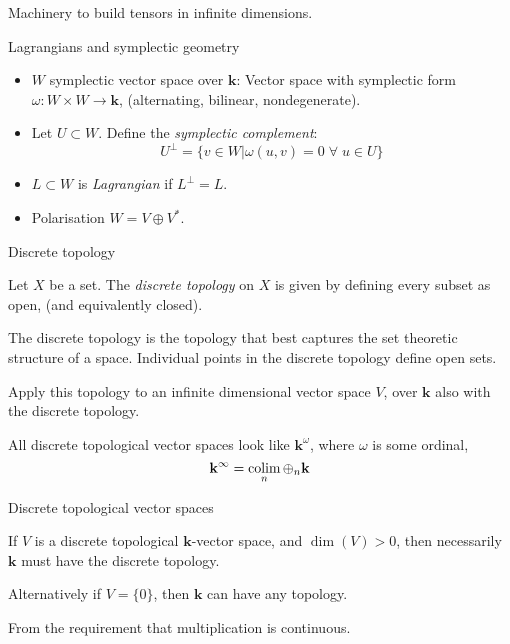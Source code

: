 
   \frame{\sectionpage}
 
    \begin{frame}
     Machinery to build tensors in infinite dimensions.
    \end{frame}
    
    \begin{frame}{Lagrangians and symplectic geometry}
        \begin{itemize}
        \item \(W\) symplectic vector space over \( \mathbf{k}\): Vector space with symplectic form \( \omega : W \times W \rightarrow \mathbf{k}\), (alternating, bilinear, nondegenerate). 
        \item Let \( U \subset W\). Define the \emph{symplectic complement}:
        \[ U^{\perp} = \{ v \in W | \omega(u,v) = 0 \; \forall \; u \in U \} \]
        \item \( L \subset W\) is \emph{Lagrangian} if \( L^{\perp} = L \).
        \item Polarisation \(W = V \oplus V^*\).
        \end{itemize}
    \end{frame}

    
    \begin{frame}{Discrete topology}
    
     \begin{defn}
        Let \(X\) be a set. The \emph{discrete topology} on \(X\) is given by defining every subset as open, (and equivalently closed).
    \end{defn}
    
    The discrete topology is the topology that best captures the set theoretic structure of a space. Individual points in the discrete topology define open sets.

    \end{frame}    


    \begin{frame}
    Apply this topology to an infinite dimensional vector space \(V\), over \( \mathbf{k}\) also with the discrete topology.
    
    All discrete topological vector spaces look like \( \mathbf{k}^{\omega}\), where \( \omega\) is some ordinal, 
    \[ \mathbf{k}^{\infty} = \operatorname*{colim}_n \oplus_n \mathbf{k}\]
    \end{frame}
    
    \begin{frame}{Discrete topological vector spaces}
    
     \begin{lem}
        If \(V\) is a discrete topological \(\mathbf{k}\)-vector space, and \(\dim(V)>0\), then necessarily \( \mathbf{k}\) must have the discrete topology. 
        
        Alternatively if \(V = \{ 0\}\), then \(\mathbf{k}\) can have any topology. 
        \end{lem} 
    
    From the requirement that multiplication is continuous.
    \end{frame}

